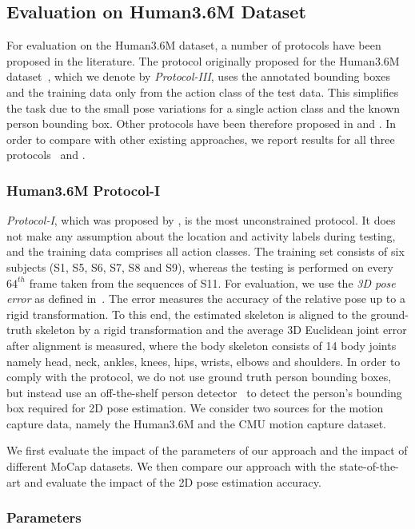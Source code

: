 \documentclass[10pt,journal,compsoc]{IEEEtran}
\begin{document}
\subsection{Evaluation on Human3.6M Dataset}
For evaluation on the Human3.6M dataset, a number of protocols have been proposed in the literature. The protocol originally proposed for the Human3.6M dataset~\cite{h36m_pami}, which we denote by \emph{Protocol-III}, uses the annotated bounding boxes
and the training data only from the action class of the test data. This simplifies the task due to the small
pose variations for a single action class and the known person bounding box. Other protocols have been therefore proposed in \cite{Ilya_2014} and \cite{bogo2016keep}. 
In order to compare with other existing approaches, we report results for all three protocols~\cite{Ilya_2014,bogo2016keep} and \cite{h36m_pami}.
\subsubsection{Human3.6M Protocol-I}
\emph{Protocol-I}, which was proposed by \cite{Ilya_2014}, is the most unconstrained protocol.
It does not 
make any assumption about the location and activity labels during testing, and the training data comprises all
action classes. The training set consists of six subjects (S1, S5, S6, S7, S8 and S9), whereas the testing 
is performed on every $64^{th}$ frame taken from the sequences of S11. For evaluation, we use the \textit{3D pose error} 
as defined in~\cite{SimoSerraCVPR2012}. The error measures the accuracy of the relative pose up to a rigid transformation.
To this end, the estimated skeleton is aligned to the ground-truth skeleton by a rigid transformation and the average 3D
Euclidean joint error after alignment is measured, where the body skeleton consists of 14 body joints namely head, neck,
ankles, knees, hips, wrists, elbows and shoulders. In order to comply with the protocol, we do not use ground truth person
bounding boxes, but instead use an off-the-shelf person detector~\cite{RenHG0CoRR15} to detect the person's 
bounding box required for 2D pose estimation. We consider two sources for the motion capture data, namely the Human3.6M and
the CMU motion capture dataset. 

We first evaluate the impact of the parameters of our approach and the impact of different MoCap datasets. We then compare our approach with the state-of-the-art and evaluate the impact of the 2D pose estimation accuracy.    

\subsubsection*{Parameters}
\end{document}
